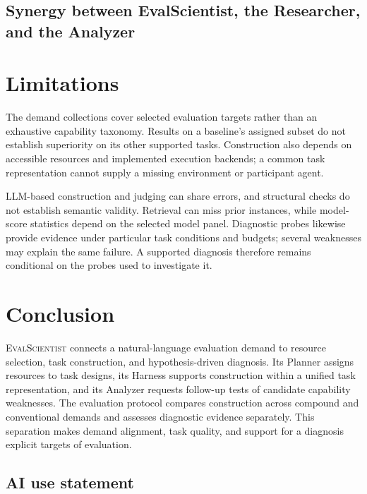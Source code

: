 \documentclass{article} %
\begin{document}
	\subsection{Synergy between EvalScientist, the Researcher, and the Analyzer}\label{sec:researcher-analyzer-synergy}

	\section{Limitations}
	\label{sec:limitations}
	
	The demand collections cover selected evaluation targets rather than an
	exhaustive capability taxonomy. Results on a baseline's assigned subset do not
	establish superiority on its other supported tasks. Construction also depends
	on accessible resources and implemented execution backends; a common task
	representation cannot supply a missing environment or participant agent.
	
	LLM-based construction and judging can share errors, and structural checks do
	not establish semantic validity. Retrieval can miss prior instances, while
	model-score statistics depend on the selected model panel. Diagnostic probes
	likewise provide evidence under particular task conditions and budgets; several
	weaknesses may explain the same failure. A supported diagnosis therefore remains
	conditional on the probes used to investigate it.
	
	
	\section{Conclusion}
	\label{sec:conclusion}
	
	\textsc{EvalScientist} connects a natural-language evaluation demand to resource
	selection, task construction, and hypothesis-driven diagnosis. Its Planner
	assigns resources to task designs, its Harness supports construction within a
	unified task representation, and its Analyzer requests follow-up tests of
	candidate capability weaknesses. The evaluation protocol compares construction
	across compound and conventional demands and assesses diagnostic evidence
	separately. This separation makes demand alignment, task quality, and support
	for a diagnosis explicit targets of evaluation.
	
	\subsection*{AI use statement}
	
\end{document}
